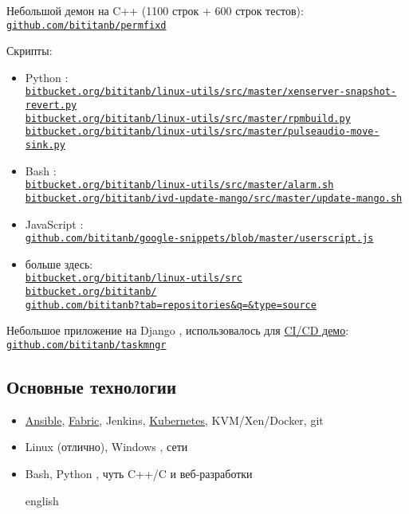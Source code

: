 \documentclass[11pt, a4paper]{article}
\newcommand{\Delimitline}{
  \vspace{-2ex}
  \noindent\makebox[\linewidth]{\rule{\DelimitlineLength}{0.12ex}} }
\newcommand\rurl[1]{%
  \-\hspace{0.5em}
  \href{http://#1}{\nolinkurl{#1}}%
}
\newcommand\Eng[1]{%
  \foreignlanguage{english}{#1}%
}
\begin{document}
\vspace{2.5ex}

Небольшой демон на \Eng{C++} (1100 строк + 600 строк тестов):
\vspace{0.4ex}\\
  \rurl{github.com/bititanb/permfixd}
  
Скрипты:
\begin{itemize}
  \item \Eng{Python}:
    \vspace{0.2em}\\
    \rurl{bitbucket.org/bititanb/linux-utils/src/master/xenserver-snapshot-revert.py}\\
    \rurl{bitbucket.org/bititanb/linux-utils/src/master/rpmbuild.py}\\
    \rurl{bitbucket.org/bititanb/linux-utils/src/master/pulseaudio-move-sink.py}
  \item \Eng{Bash}:
    \vspace{0.2ex}\\
    \rurl{bitbucket.org/bititanb/linux-utils/src/master/alarm.sh}\\
    \rurl{bitbucket.org/bititanb/ivd-update-mango/src/master/update-mango.sh}
  \item \Eng{JavaScript}:
    \vspace{0.2ex}\\
    \rurl{github.com/bititanb/google-snippets/blob/master/userscript.js}
  \item больше здесь:
    \vspace{0.2ex}\\
    \rurl{bitbucket.org/bititanb/linux-utils/src}\\
    \rurl{bitbucket.org/bititanb/}\\
    \rurl{github.com/bititanb?tab=repositories&q=&type=source}
\end{itemize}

Небольшое приложение на \Eng{Django}, использовалось для \href{https://github.com/bititanb/CI-CD-pipeline}{\Eng{CI/CD} демо}:
\vspace{0.4ex}\\
  \rurl{github.com/bititanb/taskmngr}

\subsection*{{Основные технологии}}
\Delimitline

\begin{itemize}
  \item \href{https://github.com/bititanb/ansible-taskmngr}{Ansible}, \href{https://bitbucket.org/bititanb/ivd-fabric/src}{Fabric}, Jenkins, \href{https://github.com/bititanb/ansible-taskmngr/tree/master/roles/taskmngr-kubernetes/templates}{Kubernetes}, KVM/Xen/Docker, git
  \item \Eng{Linux} (отлично), \Eng{Windows}, сети
  \item \Eng{Bash, Python}, чуть \Eng{C++/C} и веб-разработки
  \begin{otherlanguage*}{english}
  \end{otherlanguage*}
\end{itemize}
\end{document}
